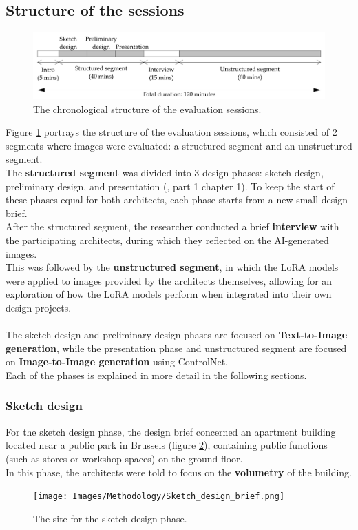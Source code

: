 \subsection{Structure of the sessions}
\begin{figure}[H]
    \centering
    \includegraphics[width=1\linewidth]{Images/Methodology/timeline_evaluation_sessions.jpg}
    \caption{The chronological structure of the evaluation sessions.}
    \label{fig:timeline}
\end{figure}
Figure \ref{fig:timeline} portrays the structure of the evaluation sessions, which consisted of 2 segments where images were evaluated: a structured segment and an unstructured segment.\\
The \textbf{structured segment} was divided into 3 design phases: sketch design, preliminary design, and presentation (\cite{riba_riba_2024}, part 1 chapter 1). To keep the start of these phases equal for both architects, each phase starts from a new small design brief.\\
After the structured segment, the researcher conducted a brief \textbf{interview} with the participating architects, during which they reflected on the AI-generated images.\\
This was followed by the \textbf{unstructured segment}, in which the LoRA models were applied to images provided by the architects themselves, allowing for an exploration of how the LoRA models perform when integrated into their own design projects.\\~\\
The sketch design and preliminary design phases are focused on \textbf{Text-to-Image generation}, while the presentation phase and unstructured segment are focused on \textbf{Image-to-Image generation} using ControlNet.\\
Each of the phases is explained in more detail in the following sections.
\subsubsection{Sketch design}
For the sketch design phase, the design brief concerned an apartment building  located near a public park in Brussels (figure \ref{fig:sketch-site}), containing public functions (such as stores or workshop spaces) on the ground floor.\\
In this phase, the architects were told to focus on the \textbf{volumetry} of the building.
\begin{figure}[H]
    \centering
    \texttt{[image: Images/Methodology/Sketch\_design\_brief.png]}
    \caption{The site for the sketch design phase.}
    \label{fig:sketch-site}
\end{figure}

